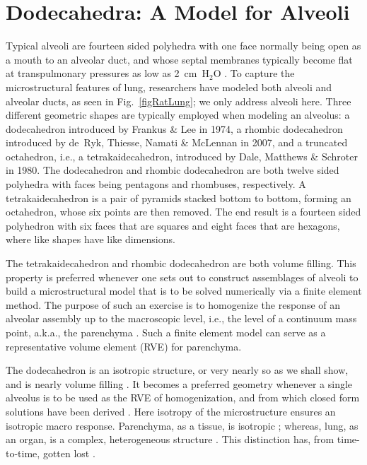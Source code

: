 \part{Dodecahedra: A Model for Alveoli}
\label{partDodecahedron}

Typical alveoli are fourteen sided polyhedra with one face normally being open as a mouth to an alveolar duct, and whose septal membranes typically become flat at trans\-pulmonary pressures as low as 2~cm~$\text{H}_2\text{O}$ \cite{HoppinHildebrandt77}.  To capture the micro\-structural features of lung, researchers have modeled both alveoli and alveolar ducts, as seen in Fig.~\ref{figRatLung}; we only address alveoli here.  Three different geometric shapes are typically employed when modeling an alveolus: a dodecahedron introduced by Frankus \& Lee \cite{FrankusLee74} in 1974, a rhombic dodecahedron introduced by de~Ryk, Thiesse, Namati \& McLennan \cite{Ryketal07} in 2007, and a truncated octahedron, i.e., a tetrakaidecahedron, introduced by Dale, Matthews \& Schroter \cite{Daleetal80} in 1980.  The dodecahedron and rhombic dodecahedron are both twelve sided polyhedra with faces being pentagons and rhombuses, respectively.  A tetrakaidecahedron is a pair of pyramids stacked bottom to bottom, forming an octahedron, whose six points are then removed.  The end result is a fourteen sided polyhedron with six faces that are squares and eight faces that are hexagons, where like shapes have like dimensions.

The tetrakaidecahedron and rhombic dodecahedron are both volume filling.  This property is preferred whenever one sets out to construct assemblages of alveoli to build a micro\-structural model that is to be solved numerically via a finite element method.  The purpose of such an exercise is to homogenize the response of an alveolar assembly up to the macroscopic level, i.e., the level of a continuum mass point, a.k.a., the parenchyma \cite{Daleetal80,DennySchroter95,DennySchroter97,DennySchroter00,Koweetal86,Ryketal07,Chenetal14}.  Such a finite element model can serve as a representative volume element (RVE) for parenchyma.

The dodecahedron is an isotropic structure, or very nearly so as we shall show, and is nearly volume filling \cite{Kimmeletal87}.  It becomes a preferred geometry whenever a single alveolus is to be used as the RVE of homo\-genization, and from which closed form solutions have been derived \cite{BudianskyKimmel87,KimmelBudiansky90,Kimmeletal87,Freedetal12}.  Here isotropy of the microstructure ensures an isotropic macro response.  Parenchyma, as a tissue, is isotropic \cite{Weedetal15,Fung88,Hughesetal72}; whereas, lung, as an organ, is a complex, heterogeneous structure \cite{Mead73,West07}.  This distinction has, from time-to-time, gotten lost \cite{DennySchroter06}.  

